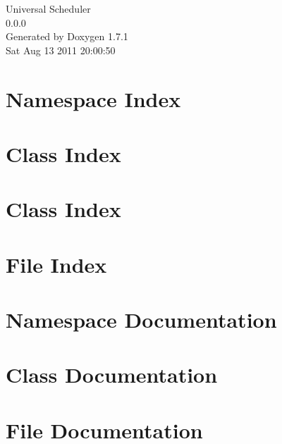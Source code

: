 \documentclass[a4paper]{book}
\begin{document}
\hypersetup{pageanchor=false}
\begin{titlepage}
\vspace*{7cm}
\begin{center}
{\Large Universal Scheduler \\[1ex]\large 0.0.0 }\\
\vspace*{1cm}
{\large Generated by Doxygen 1.7.1}\\
\vspace*{0.5cm}
{\small Sat Aug 13 2011 20:00:50}\\
\end{center}
\end{titlepage}
\clearemptydoublepage
{}
\tableofcontents
\clearemptydoublepage
{}
\hypersetup{pageanchor=true}
\chapter{Namespace Index}

\chapter{Class Index}

\chapter{Class Index}

\chapter{File Index}

\chapter{Namespace Documentation}

\chapter{Class Documentation}










\chapter{File Documentation}















\printindex
\end{document}
